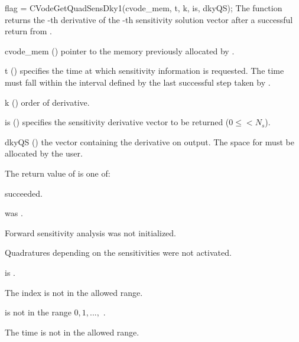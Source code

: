 {}
{
  flag = CVodeGetQuadSensDky1(cvode\_mem, t, k, is, dkyQS);
}
{
  The function  returns the -th derivative of the 
  -th sensitivity solution vector after a successful 
  return from .
}
{
  \begin{args}
  \item[cvode\_mem] ()
    pointer to the memory previously allocated by .
  \item[t] ()
    specifies the time at which sensitivity information is 
    requested. The time  must fall within the interval defined by the last 
    successful step taken by {\cvodes}.
  \item[k] () order of derivative.
  \item[is] () specifies the sensitivity derivative vector to be returned
    ($0\le$$< N_s$).
  \item[dkyQS] ()
    the vector containing the derivative on output. The space for  must be
    allocated by the user. 
  \end{args}
}
{
  The return value  of  is one of:
  \begin{args}[CV\_NO\_QUADSENS]
  \item[\Id{CV\_SUCCESS}] 
     succeeded.
  \item[\Id{CVODE\_MEM\_NULL}] 
     was .
  \item[\Id{CV\_NO\_SENS}] 
    Forward sensitivity analysis was not initialized.
  \item[\Id{CV\_NO\_QUADSENS}] 
    Quadratures depending on the sensitivities were not activated.
  \item[\Id{CV\_BAD\_DKY}] 
     is .
  \item[\Id{CV\_BAD\_IS}]
    The index  is not in the allowed range.
  \item[\Id{CV\_BAD\_K}] 
     is not in the range $0, 1, ...,$ .
  \item[\Id{CV\_BAD\_T}] 
    The time  is not in the allowed range.
  \end{args}
}
{}



